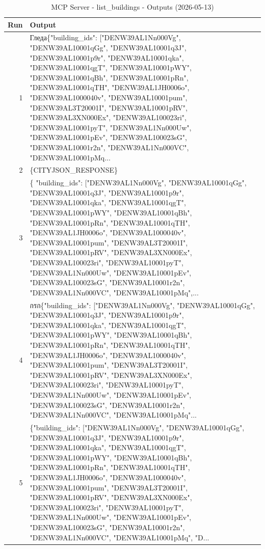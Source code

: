 \documentclass[a4paper,11pt]{article}
\begin{document}
\clearpage

\begin{table}[ht]
\centering
\scriptsize
\caption{MCP Server - list\_buildings - Outputs (2026-05-13)}
\label{tab:mcp\_list\_buildings\_outputs\_2026-05-13}
\begin{tabular}{r p{12cm}}
\hline
Run & Output \\
\hline
1 & Гледа\{"building\_ids": ["DENW39AL1Nn000Vg", "DENW39AL10001qGg", "DENW39AL10001q3J", "DENW39AL10001p9r", "DENW39AL10001qka", "DENW39AL10001qgT", "DENW39AL10001pWY", "DENW39AL10001qBh", "DENW39AL10001pRn", "DENW39AL10001qTH", "DENW39AL1JH0006o", "DENW39AL1000040v", "DENW39AL10001pum", "DENW39AL3T20001I", "DENW39AL10001pRV", "DENW39AL3XN000Ex", "DENW39AL100023ri", "DENW39AL10001pyT", "DENW39AL1Nn000Uw", "DENW39AL10001pEv", "DENW39AL100023sG", "DENW39AL10001r2n", "DENW39AL1Nn000VC", "DENW39AL10001pMq... \\
2 & \{CITYJSON\_RESPONSE\} \\
3 & \{
  "building\_ids": ["DENW39AL1Nn000Vg", "DENW39AL10001qGg", "DENW39AL10001q3J", "DENW39AL10001p9r", "DENW39AL10001qka", "DENW39AL10001qgT", "DENW39AL10001pWY", "DENW39AL10001qBh", "DENW39AL10001pRn", "DENW39AL10001qTH", "DENW39AL1JH0006o", "DENW39AL1000040v", "DENW39AL10001pum", "DENW39AL3T20001I", "DENW39AL10001pRV", "DENW39AL3XN000Ex", "DENW39AL100023ri", "DENW39AL10001pyT", "DENW39AL1Nn000Uw", "DENW39AL10001pEv", "DENW39AL100023sG", "DENW39AL10001r2n", "DENW39AL1Nn000VC", "DENW39AL10001pMq",... \\
4 &  กรก\{"building\_ids": ["DENW39AL1Nn000Vg", "DENW39AL10001qGg", "DENW39AL10001q3J", "DENW39AL10001p9r", "DENW39AL10001qka", "DENW39AL10001qgT", "DENW39AL10001pWY", "DENW39AL10001qBh", "DENW39AL10001pRn", "DENW39AL10001qTH", "DENW39AL1JH0006o", "DENW39AL1000040v", "DENW39AL10001pum", "DENW39AL3T20001I", "DENW39AL10001pRV", "DENW39AL3XN000Ex", "DENW39AL100023ri", "DENW39AL10001pyT", "DENW39AL1Nn000Uw", "DENW39AL10001pEv", "DENW39AL100023sG", "DENW39AL10001r2n", "DENW39AL1Nn000VC", "DENW39AL10001pMq"... \\
5 & \{"building\_ids": ["DENW39AL1Nn000Vg", "DENW39AL10001qGg", "DENW39AL10001q3J", "DENW39AL10001p9r", "DENW39AL10001qka", "DENW39AL10001qgT", "DENW39AL10001pWY", "DENW39AL10001qBh", "DENW39AL10001pRn", "DENW39AL10001qTH", "DENW39AL1JH0006o", "DENW39AL1000040v", "DENW39AL10001pum", "DENW39AL3T20001I", "DENW39AL10001pRV", "DENW39AL3XN000Ex", "DENW39AL100023ri", "DENW39AL10001pyT", "DENW39AL1Nn000Uw", "DENW39AL10001pEv", "DENW39AL100023sG", "DENW39AL10001r2n", "DENW39AL1Nn000VC", "DENW39AL10001pMq", "D... \\
\hline
\end{tabular}
\end{table}
\end{document}
